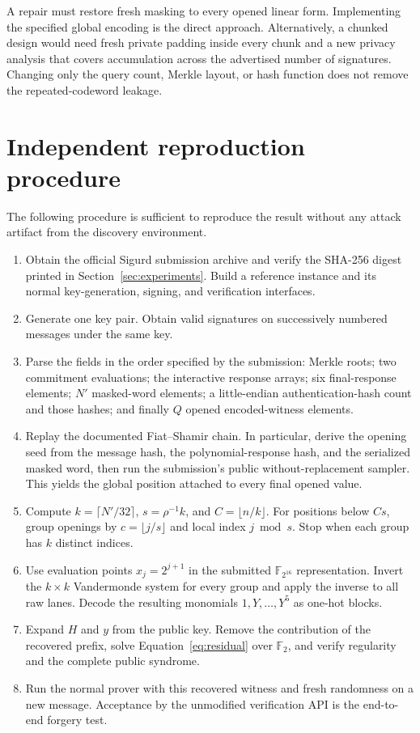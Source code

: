 \documentclass[11pt,a4paper]{article}
\newcommand{\F}{\mathbb{F}}
\begin{document}
A repair must restore fresh masking to every opened linear form.  Implementing
the specified global encoding is the direct approach.  Alternatively, a
chunked design would need fresh private padding inside every chunk and a new
privacy analysis that covers accumulation across the advertised number of
signatures.  Changing only the query count, Merkle layout, or hash function
does not remove the repeated-codeword leakage.

\section{Independent reproduction procedure}
\label{sec:reproduction}

The following procedure is sufficient to reproduce the result without any
attack artifact from the discovery environment.

\begin{enumerate}[leftmargin=1.8em]
  \item Obtain the official Sigurd submission archive and verify the SHA-256
        digest printed in Section~\ref{sec:experiments}.  Build a reference
        instance and its normal key-generation, signing, and verification
        interfaces.
  \item Generate one key pair.  Obtain valid signatures on successively
        numbered messages under the same key.
  \item Parse the fields in the order specified by the submission:
        Merkle roots; two commitment evaluations; the interactive response
        arrays; six final-response elements; $N'$ masked-word elements; a
        little-endian authentication-hash count and those hashes; and finally
        $Q$ opened encoded-witness elements.
  \item Replay the documented Fiat--Shamir chain.  In particular, derive the
        opening seed from the message hash, the polynomial-response hash, and
        the serialized masked word, then run the submission's public
        without-replacement sampler.  This yields the global position attached
        to every final opened value.
  \item Compute $k=\lceil N'/32\rceil$, $s=\rho^{-1}k$, and
        $C=\lfloor n/k\rfloor$.  For positions below $Cs$, group openings by
        $c=\lfloor j/s\rfloor$ and local index $j\bmod s$.  Stop when each
        group has $k$ distinct indices.
  \item Use evaluation points $x_j=2^{j+1}$ in the submitted
        $\F_{2^{16}}$ representation.  Invert the $k\times k$ Vandermonde
        system for every group and apply the inverse to all raw lanes.  Decode
        the resulting monomials $1,Y,\ldots,Y^5$ as one-hot blocks.
  \item Expand $H$ and $y$ from the public key.  Remove the contribution of
        the recovered prefix, solve Equation~\eqref{eq:residual} over $\F_2$,
        and verify regularity and the complete public syndrome.
  \item Run the normal prover with this recovered witness and fresh randomness
        on a new message.  Acceptance by the unmodified verification API is
        the end-to-end forgery test.
\end{enumerate}
\end{document}
